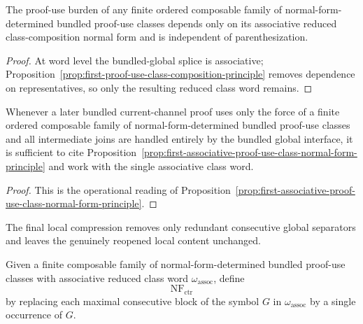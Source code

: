 \begin{proposition}
\label{prop:first-associative-proof-use-class-normal-form-principle}
The proof-use burden of any finite ordered composable family of normal-form-determined bundled proof-use classes depends only on its associative reduced class-composition normal form and is independent of parenthesization.
\end{proposition}

\begin{proof}
At word level the bundled-global splice is associative; Proposition~\ref{prop:first-proof-use-class-composition-principle} removes dependence on representatives, so only the resulting reduced class word remains.
\end{proof}

\begin{corollary}
\label{cor:use-rule-for-the-first-associative-proof-use-class-normal-form-principle}
Whenever a later bundled current-channel proof uses only the force of a finite ordered composable family of normal-form-determined bundled proof-use classes and all intermediate joins are handled entirely by the bundled global interface, it is sufficient to cite Proposition~\ref{prop:first-associative-proof-use-class-normal-form-principle} and work with the single associative class word.
\end{corollary}

\begin{proof}
This is the operational reading of Proposition~\ref{prop:first-associative-proof-use-class-normal-form-principle}.
\end{proof}

\begin{remark}
\label{rem:status-of-the-first-contraction-stable-class-normal-form-step}
The final local compression removes only redundant consecutive global separators and leaves the genuinely reopened local content unchanged.
\end{remark}

\begin{definition}
\label{def:contraction-stable-reduced-class-normal-form-word}
Given a finite composable family of normal-form-determined bundled proof-use classes with associative reduced class word $\omega_{\mathrm{assoc}}$, define
\[
\operatorname{NF}_{\mathrm{ctr}}
\]
by replacing each maximal consecutive block of the symbol $G$ in $\omega_{\mathrm{assoc}}$ by a single occurrence of $G$.
\end{definition}

